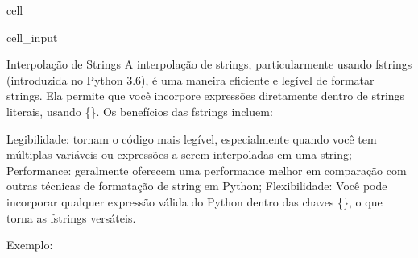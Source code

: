 \documentclass[letterpaper,10pt,english]{jupyterBook}
\begin{document}
\begin{sphinxuseclass}{cell}\begin{sphinxVerbatimInput}

\begin{sphinxuseclass}{cell_input}
\begin{sphinxVerbatim}[commandchars=\\\{\}]
  
      
\end{sphinxVerbatim}

\end{sphinxuseclass}\end{sphinxVerbatimInput}

\end{sphinxuseclass}
\sphinxAtStartPar
Interpolação de Strings
A interpolação de strings, particularmente usando f\sphinxhyphen{}strings (introduzida no Python 3.6), é uma maneira eficiente e legível de formatar strings. Ela permite que você incorpore expressões diretamente dentro de strings literais, usando \{\}. Os benefícios das f\sphinxhyphen{}strings incluem:

\sphinxAtStartPar
Legibilidade: tornam o código mais legível, especialmente quando você tem múltiplas variáveis ou expressões a serem interpoladas em uma string;
Performance: geralmente oferecem uma performance melhor em comparação com outras técnicas de formatação de string em Python;
Flexibilidade: Você pode incorporar qualquer expressão válida do Python dentro das chaves \{\}, o que torna as f\sphinxhyphen{}strings versáteis.

\sphinxAtStartPar
Exemplo:
\end{document}
